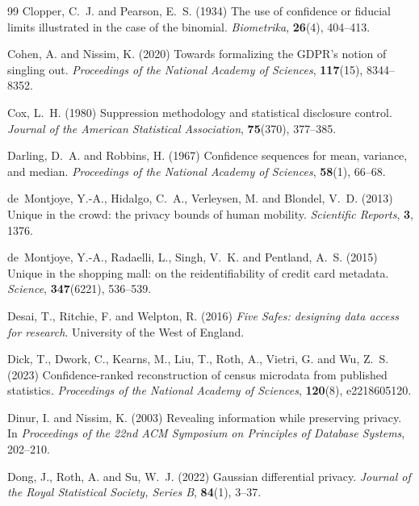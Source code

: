 \documentclass[11pt,a4paper]{article}
\theoremstyle{plain}
\theoremstyle{definition}
\begin{document}
\begin{thebibliography}{99}
Clopper, C.~J. and Pearson, E.~S. (1934) The use of confidence or fiducial
limits illustrated in the case of the binomial. \emph{Biometrika},
\textbf{26}(4), 404--413.

Cohen, A. and Nissim, K. (2020) Towards formalizing the GDPR's notion of
singling out. \emph{Proceedings of the National Academy of Sciences},
\textbf{117}(15), 8344--8352.

Cox, L.~H. (1980) Suppression methodology and statistical disclosure control.
\emph{Journal of the American Statistical Association}, \textbf{75}(370),
377--385.

Darling, D.~A. and Robbins, H. (1967) Confidence sequences for mean, variance,
and median. \emph{Proceedings of the National Academy of Sciences},
\textbf{58}(1), 66--68.

de~Montjoye, Y.-A., Hidalgo, C.~A., Verleysen, M. and Blondel, V.~D. (2013)
Unique in the crowd: the privacy bounds of human mobility. \emph{Scientific
Reports}, \textbf{3}, 1376.

de~Montjoye, Y.-A., Radaelli, L., Singh, V.~K. and Pentland, A.~S. (2015) Unique
in the shopping mall: on the reidentifiability of credit card metadata.
\emph{Science}, \textbf{347}(6221), 536--539.

Desai, T., Ritchie, F. and Welpton, R. (2016) \emph{Five Safes: designing data
access for research}. University of the West of England.

Dick, T., Dwork, C., Kearns, M., Liu, T., Roth, A., Vietri, G. and Wu, Z.~S.
(2023) Confidence-ranked reconstruction of census microdata from published
statistics. \emph{Proceedings of the National Academy of Sciences},
\textbf{120}(8), e2218605120.

Dinur, I. and Nissim, K. (2003) Revealing information while preserving privacy.
In \emph{Proceedings of the 22nd ACM Symposium on Principles of Database
Systems}, 202--210.

Dong, J., Roth, A. and Su, W.~J. (2022) Gaussian differential privacy.
\emph{Journal of the Royal Statistical Society, Series B}, \textbf{84}(1),
3--37.


\end{thebibliography}
\end{document}
